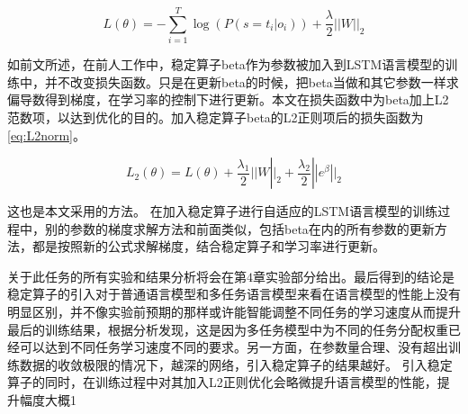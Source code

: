 \begin{equation}
	\label{eq:Lnow}
   	L\left( \theta  \right) =  - \sum\limits_{i = 1}^T {\log \left( {P\left( {s = {t_i}|{o_i}} \right)} \right)}  + \frac{\lambda }{2}||W|{|_2}
\end{equation} 

如前文所述，在前人工作中，稳定算子beta作为参数被加入到LSTM语言模型的训练中，并不改变损失函数。只是在更新beta的时候，把beta当做和其它参数一样求偏导数得到梯度，在学习率的控制下进行更新。本文在损失函数中为beta加上L2范数项，以达到优化的目的。加入稳定算子beta的L2正则项后的损失函数为\ref{eq:L2norm}。

\begin{equation}
	\label{eq:L2norm}
   	{L_2}\left( \theta  \right) = L\left( \theta  \right) + \frac{{{\lambda _1}}}{2}||W|{|_2} + \frac{{{\lambda _2}}}{2}||{e^\beta }|{|_2}
\end{equation} 


这也是本文采用的方法。
在加入稳定算子进行自适应的LSTM语言模型的训练过程中，别的参数的梯度求解方法和前面类似，包括beta在内的所有参数的更新方法，都是按照新的公式求解梯度，结合稳定算子和学习率进行更新。

	关于此任务的所有实验和结果分析将会在第$4$章实验部分给出。最后得到的结论是稳定算子的引入对于普通语言模型和多任务语言模型来看在语言模型的性能上没有明显区别，并不像实验前预期的那样或许能智能调整不同任务的学习速度从而提升最后的训练结果，根据分析发现，这是因为多任务模型中为不同的任务分配权重已经可以达到不同任务学习速度不同的要求。另一方面，在参数量合理、没有超出训练数据的收敛极限的情况下，越深的网络，引入稳定算子的结果越好。
	引入稳定算子的同时，在训练过程中对其加入L2正则优化会略微提升语言模型的性能，提升幅度大概1%


